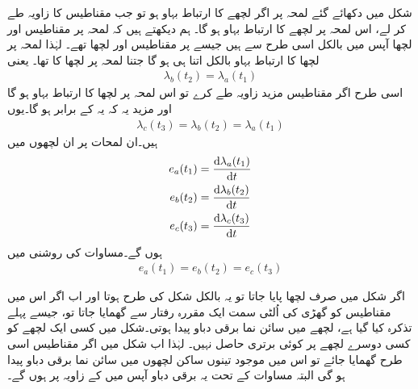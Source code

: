  شکل   میں دکھائے گئے لمحہ  پر  اگر لچھے  کا  ارتباط بہاو  ہو تو جب مقناطیس  کا زاویہ طے کر لے، اس لمحہ  پر  لچھے  کا ارتباط بہاو  ہو گا۔ ہم  دیکھتے ہیں کہ لمحہ  پر مقناطیس اور لچھا  آپس میں بالکل اسی طرح سے ہیں جیسے  پر مقناطیس اور لچھا  تھے۔ لہٰذا لمحہ  پر لچھا  کا ارتباط بہاو بالکل اتنا ہی ہو گا جتنا لمحہ  پر   لچھا کا تھا۔ یعنی
\begin{align}
\lambda_b(t_2)=\lambda_a(t_1)
\end{align}
اسی طرح اگر مقناطیس مزید   زاویہ طے کرے تو اس لمحہ  پر لچھا  کا ارتباط بہاو   ہو گا اور مزید یہ کہ یہ  کے برابر ہو گا۔یوں
\begin{align}\label{مساوات_گھومتے_مشین_مختلف_اوقات_پر_تین_لچھے_یکساں}
\lambda_c(t_3)=\lambda_b(t_2)=\lambda_a(t_1)
\end{align}
ہیں۔ان لمحات پر ان  لچھوں میں
\begin{align}
e_a(t_1)&=\frac{\dif \lambda_a(t_1)}{\dif t}\\
e_b(t_2)&=\frac{\dif \lambda_b(t_2)}{\dif t}\\
e_c(t_3)&=\frac{\dif \lambda_c(t_3)}{\dif t}
\end{align}
ہوں گے۔مساوات     کی روشنی میں
\begin{align}\label{مساوات_گھومتے_مشین_تین_لمحات_دباو_یکساں}
e_a(t_1)=e_b(t_2)=e_c(t_3)
\end{align} 

اگر شکل  میں صرف لچھا  پایا جاتا تو یہ بالکل شکل    کی طرح ہوتا اور اب اگر اس میں مقناطیس کو گھڑی کی اُلٹی سمت ایک مقررہ رفتار  سے گھمایا جاتا تو، جیسے پہلے تذکرہ کیا گیا ہے، لچھے  میں سائن نما برقی دباو پیدا ہوتی۔شکل   میں کسی ایک لچھے کو کسی دوسرے لچھے پر کوئی برتری حاصل نہیں۔ لہٰذا اب شکل   میں اگر مقناطیس اسی طرح گھمایا جائے تو اس میں موجود تینوں ساکن لچھوں میں سائن نما برقی دباو پیدا ہو گی البتہ مساوات     کے تحت یہ برقی دباو آپس میں   کے زاویہ پر ہوں گے۔


